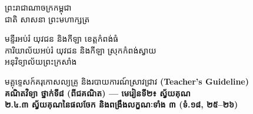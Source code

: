 \documentclass[a4paper,12pt]{article}
\newcommand{\en}[1]{{\TimesEn #1}}
\newcommand{\enbf}[1]{{\TimesEn\textbf{#1}}}
\newcommand{\khmflourish}{{\Tacteing\fontsize{38pt}{15pt}\selectfont\raisebox{-5pt}{3}}}
\newcommand{\parttitle}[1]{{\muol\fontsize{14pt}{22pt}\selectfont #1}}
\begin{document}
\thispagestyle{firstpage}
\fontsize{11.5pt}{18.2pt}\selectfont
\vspace*{-0.75cm}

{\linespread{1.08}\selectfont
\begin{center}
  {\muol\fontsize{13.5pt}{21pt}\selectfont ព្រះរាជាណាចក្រកម្ពុជា}\\[2pt]
  {\muol\fontsize{12pt}{18.5pt}\selectfont ជាតិ សាសនា ព្រះមហាក្សត្រ}\\[1pt]
  \khmflourish
\end{center}
\vspace{-4pt}
{\muol\fontsize{10.8pt}{17pt}\selectfont
  មន្ទីរអប់រំ យុវជន និងកីឡា ខេត្តកំពង់ធំ\\
  ការិយាល័យអប់រំ យុវជន និងកីឡា ស្រុកកំពង់ស្វាយ\\
  អនុវិទ្យាល័យព្រះក្រសាំង\par}
\vspace{4pt}
\begin{center}
  \parttitle{មគ្គុទ្ទេសក៍គរុកោសល្យគ្រូ និងរបាយការណ៍ស្រាវជ្រាវ \enbf{(Teacher's Guideline)}}\\[3pt]
  {\fontsize{11.5pt}{18pt}\selectfont\textbf{គណិតវិទ្យា ថ្នាក់ទី៨ \en{(}ពីជគណិត\en{)} \en{---} មេរៀនទី២៖ ស្វ័យគុណ}}\\
  {\fontsize{11.0pt}{17pt}\selectfont\textbf{២.៤.៣ ស្វ័យគុណនៃផលចែក និងពង្រឹងលក្ខណៈទាំង ៣ \en{(}ទំ.១៨, ២៥--២៦\en{)}}}
\end{center}
}
\end{document}
